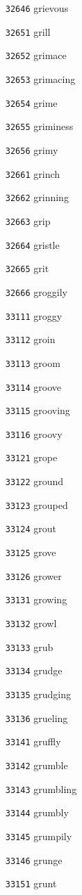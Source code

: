 \documentclass[twoside,11pt]{article}
\begin{document}
\begin{multicols}{5}
\begin{enumerate}
\item[\texttt{32646}] grievous
\item[\texttt{32651}] grill
\item[\texttt{32652}] grimace
\item[\texttt{32653}] grimacing
\item[\texttt{32654}] grime
\item[\texttt{32655}] griminess
\item[\texttt{32656}] grimy
\item[\texttt{32661}] grinch
\item[\texttt{32662}] grinning
\item[\texttt{32663}] grip
\item[\texttt{32664}] gristle
\item[\texttt{32665}] grit
\item[\texttt{32666}] groggily
\item[\texttt{33111}] groggy
\item[\texttt{33112}] groin
\item[\texttt{33113}] groom
\item[\texttt{33114}] groove
\item[\texttt{33115}] grooving
\item[\texttt{33116}] groovy
\item[\texttt{33121}] grope
\item[\texttt{33122}] ground
\item[\texttt{33123}] grouped
\item[\texttt{33124}] grout
\item[\texttt{33125}] grove
\item[\texttt{33126}] grower
\item[\texttt{33131}] growing
\item[\texttt{33132}] growl
\item[\texttt{33133}] grub
\item[\texttt{33134}] grudge
\item[\texttt{33135}] grudging
\item[\texttt{33136}] grueling
\item[\texttt{33141}] gruffly
\item[\texttt{33142}] grumble
\item[\texttt{33143}] grumbling
\item[\texttt{33144}] grumbly
\item[\texttt{33145}] grumpily
\item[\texttt{33146}] grunge
\item[\texttt{33151}] grunt

\end{enumerate}
\end{multicols}
\end{document}
